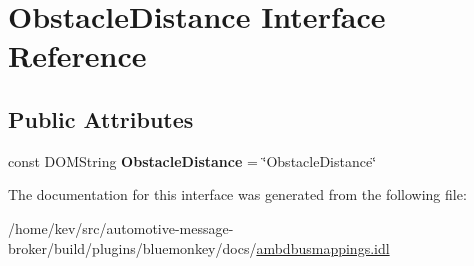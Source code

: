 \hypertarget{interfaceObstacleDistance}{\section{Obstacle\+Distance Interface Reference}
\label{interfaceObstacleDistance}
}
\subsection*{Public Attributes}
\begin{DoxyCompactItemize}
\item 
\hypertarget{interfaceObstacleDistance_af20a13bd24843a62ef97c4d36b7ee466}{const D\+O\+M\+String {\bfseries Obstacle\+Distance} = \char`\"{}Obstacle\+Distance\char`\"{}}\label{interfaceObstacleDistance_af20a13bd24843a62ef97c4d36b7ee466}

\end{DoxyCompactItemize}


The documentation for this interface was generated from the following file\+:\begin{DoxyCompactItemize}
\item 
/home/kev/src/automotive-\/message-\/broker/build/plugins/bluemonkey/docs/\hyperlink{ambdbusmappings_8idl}{ambdbusmappings.\+idl}\end{DoxyCompactItemize}
